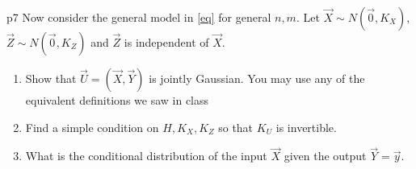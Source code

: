 \documentclass[a4paper, 11pt]{article}
\begin{document}
\begin{problem}{%
    }{p7%
    }
    Now consider the general model in \eqref{eq} for general $n,m$. Let $\vec{X}\sim N(\vec{0}, K_X)$, $\vec{Z}\sim N(\vec{0},K_Z)$ and $\vec{Z}$ is independent of $\vec{X}$.
    \begin{enumerate}[label=(\alph*)]
        \item Show that $\vec{U}=(\vec{X},\vec{Y})$ is jointly Gaussian. You may use any of the equivalent definitions we saw in class
        \item Find a simple condition on $H,K_X,K_Z$ so that $K_U$ is invertible.
        \item What is the conditional distribution of the input $\vec{X}$ given the output $\vec{Y}=\vec{y}$.
    \end{enumerate}
\end{problem}
\end{document}
